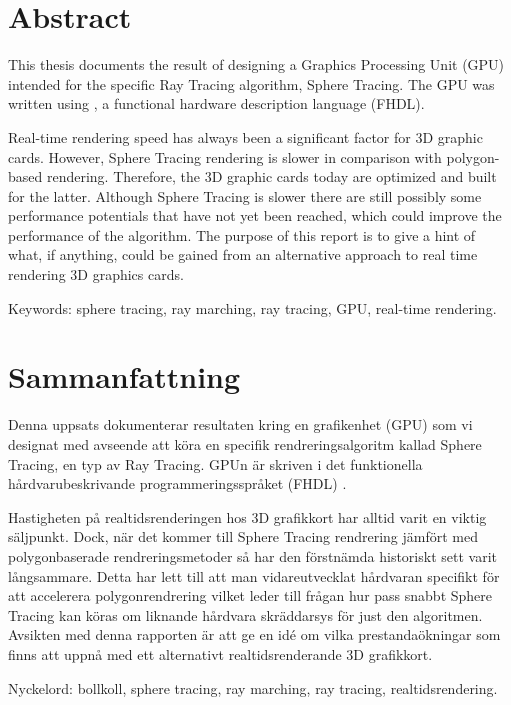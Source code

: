 \thispagestyle{plain}			%
\setlength{\parskip}{0pt plus 1.0pt}

\section*{Abstract}
	
	This thesis documents the result of designing a Graphics Processing Unit
	(GPU) intended for the specific Ray Tracing algorithm, Sphere Tracing. The
	GPU was written using \clash, a functional hardware description language
	(FHDL). 

	Real-time rendering speed has always been a significant factor for 3D graphic
	cards. However, Sphere Tracing rendering is slower in comparison with
	polygon-based rendering. Therefore, the 3D graphic cards today are optimized
	and built for the latter. Although Sphere Tracing is slower there are still
	possibly some performance potentials that have not yet been reached, which
	could improve the performance of the algorithm. The purpose of this report
	is to give a hint of what, if anything, could be gained from an alternative
	approach to real time rendering 3D graphics cards.

	\vfill
	Keywords: sphere tracing, ray marching, ray tracing, GPU, real-time rendering.

\newpage
\thispagestyle{plain}

\section*{Sammanfattning}
	
	Denna uppsats dokumenterar resultaten kring en grafikenhet (GPU) som vi
	designat med avseende att köra en specifik rendreringsalgoritm kallad Sphere
	Tracing, en typ av Ray Tracing. GPUn är skriven i det funktionella
	hårdvarubeskrivande programmeringsspråket (FHDL) \clash.
	
	Hastigheten på realtidsrenderingen hos 3D grafikkort har alltid varit en
	viktig säljpunkt. Dock, när det kommer till Sphere Tracing rendrering jämfört
	med polygonbaserade rendreringsmetoder så har den förstnämda historiskt sett
	varit långsammare. Detta har lett till att man vidareutvecklat hårdvaran
	specifikt för att accelerera polygonrendrering vilket leder till frågan hur
	pass snabbt Sphere Tracing kan köras om liknande hårdvara skräddarsys för
	just den algoritmen. Avsikten med denna rapporten är att ge en idé om vilka
	prestandaökningar som finns att uppnå med ett alternativt realtidsrenderande
	3D grafikkort.
	
	\vfill
	Nyckelord: bollkoll, sphere tracing, ray marching, ray tracing, realtidsrendering.


\newpage
\thispagestyle{empty}
\mbox{}
